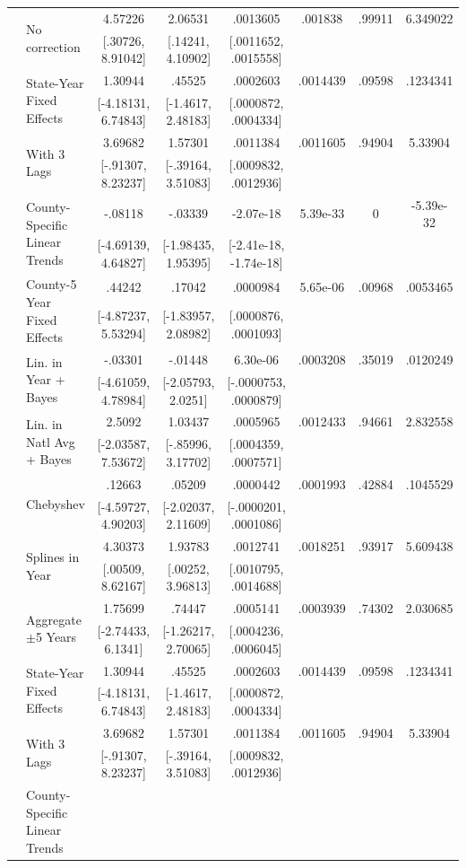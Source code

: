 \begin{landscape}
\begin{table}[htb]
\begin{threeparttable}
{\begin{tabular}{llcccccc}
  & \multirow{2}{*}{No correction} & 4.57226 & 2.06531 &  .0013605 & .001838 & .99911 & 6.349022 \\  & & [.30726, 8.91042] & [.14241, 4.10902] & [.0011652, .0015558] & & \\  & \multirow{2}{*}{State-Year Fixed Effects} & 1.30944 & .45525 &  .0002603 & .0014439 & .09598 & .1234341 \\  & & [-4.18131, 6.74843] & [-1.4617, 2.48183] & [.0000872, .0004334] & & \\  & \multirow{2}{*}{With 3 Lags} & 3.69682 & 1.57301 &  .0011384 & .0011605 & .94904 & 5.33904 \\  & & [-.91307, 8.23237] & [-.39164, 3.51083] & [.0009832, .0012936] & & \\  & \multirow{2}{*}{County-Specific Linear Trends} & -.08118 & -.03339 & -2.07e-18 & 5.39e-33 & 0 & -5.39e-32 \\  & & [-4.69139, 4.64827] & [-1.98435, 1.95395] & [-2.41e-18, -1.74e-18] & & \\  & \multirow{2}{*}{County-5 Year Fixed Effects} & .44242 & .17042 &  .0000984 & 5.65e-06 & .00968 & .0053465 \\  & & [-4.87237, 5.53294] & [-1.83957, 2.08982] & [.0000876, .0001093] & & \\  & \multirow{2}{*}{Lin. in Year + Bayes} & -.03301 & -.01448 &  6.30e-06 & .0003208 & .35019 & .0120249 \\  & & [-4.61059, 4.78984] & [-2.05793, 2.0251] & [-.0000753, .0000879] & & \\  & \multirow{2}{*}{Lin. in Natl Avg + Bayes} & 2.5092 & 1.03437 &  .0005965 & .0012433 & .94661 & 2.832558 \\  & & [-2.03587, 7.53672] & [-.85996, 3.17702] & [.0004359, .0007571] & & \\  & \multirow{2}{*}{Chebyshev} & .12663 & .05209 &  .0000442 & .0001993 & .42884 & .1045529 \\  & & [-4.59727, 4.90203] & [-2.02037, 2.11609] & [-.0000201, .0001086] & & \\  & \multirow{2}{*}{Splines in Year} & 4.30373 & 1.93783 &  .0012741 & .0018251 & .93917 & 5.609438 \\  & & [.00509, 8.62167] & [.00252, 3.96813] & [.0010795, .0014688] & & \\  & \multirow{2}{*}{Aggregate \(\pm\)5 Years} & 1.75699 & .74447 &  .0005141 & .0003939 & .74302 & 2.030685 \\  & & [-2.74433, 6.1341] & [-1.26217, 2.70065] & [.0004236, .0006045] & & \\  & \multirow{2}{*}{State-Year Fixed Effects} & 1.30944 & .45525 &  .0002603 & .0014439 & .09598 & .1234341 \\  & & [-4.18131, 6.74843] & [-1.4617, 2.48183] & [.0000872, .0004334] & & \\  & \multirow{2}{*}{With 3 Lags} & 3.69682 & 1.57301 &  .0011384 & .0011605 & .94904 & 5.33904 \\  & & [-.91307, 8.23237] & [-.39164, 3.51083] & [.0009832, .0012936] & & \\  & \multirow{2}{*}{County-Specific Linear Trends} & 
\end{tabular}}
\end{threeparttable}
\end{table}
\end{landscape}
